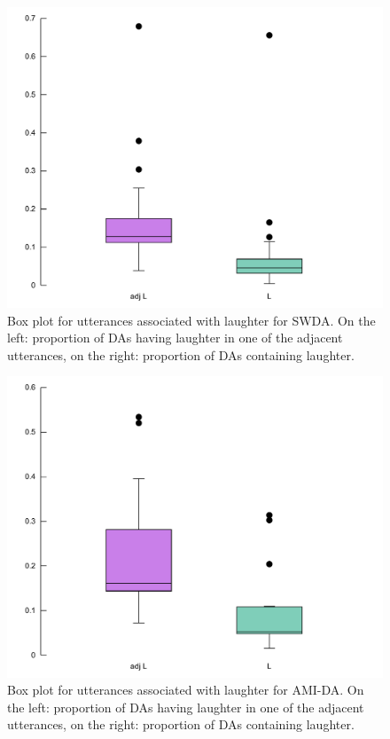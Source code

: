 \documentclass[11pt,a4paper]{article}
\begin{document}
\begin{figure}
  \centering
  \includegraphics[width=\the\columnwidth]{img/box-swda.pdf}
  \caption{Box plot for utterances associated with laughter for SWDA. On the left: proportion of DAs having laughter in one of the adjacent utterances, on the right: proportion of DAs containing laughter. }
    \label{fig:box-swda}
\end{figure}

\begin{figure}
  \centering
  \includegraphics[width=\the\columnwidth]{img/box-ami.pdf}
  \caption{Box plot for utterances associated with laughter for AMI-DA. On the left: proportion of DAs having laughter in one of the adjacent utterances, on the right: proportion of DAs containing laughter. }
    \label{fig:box-ami}
\end{figure}
\end{document}
